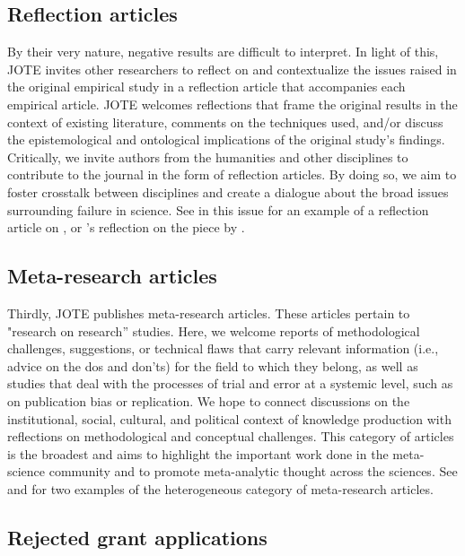 \documentclass[twocolumn, serif, editorial, authordate]{jote-article}
\begin{document}
 {}\subsection*{Reflection articles}

By their very nature, negative results are difficult to interpret. In light of this, JOTE invites other researchers to reflect on and contextualize the issues raised in the original empirical study in a reflection article that accompanies each empirical article. JOTE welcomes reflections that frame the original results in the context of existing literature, comments on the techniques used, and/or discuss the epistemological and ontological implications of the original study's findings. Critically, we invite authors from the humanities and other disciplines to contribute to the journal in the form of reflection articles. By doing so, we aim to foster crosstalk between disciplines and create a dialogue about the broad issues surrounding failure in science. See \textcite{Abma2020} in this issue for an example of a reflection article on \textcite{Leboeuf2020b}, or \textcite{Derksen2020}'s reflection on the piece by \textcite{Traxler2020}.

 {}\subsection*{Meta-research articles}

Thirdly, JOTE publishes meta-research articles. These articles pertain to "research on research'' studies. Here, we welcome reports of methodological challenges, suggestions, or technical flaws that carry relevant information (i.e., advice on the dos and don'ts) for the field to which they belong, as well as studies that deal with the processes of trial and error at a systemic level, such as on publication bias or replication. We hope to connect discussions on the institutional, social, cultural, and political context of knowledge production with reflections on methodological and conceptual challenges. This category of articles is the broadest and aims to highlight the important work done in the meta-science community and to promote meta-analytic thought across the sciences. See \textcite{DeGroot2020a} and \textcite{Nelson2020a} for two examples of the heterogeneous category of meta-research articles.

 {}\subsection*{Rejected grant applications}
\end{document}

